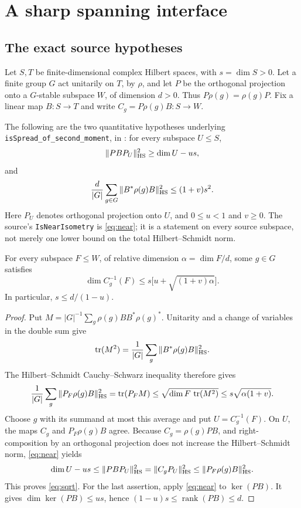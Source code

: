 \section{A sharp spanning interface}
\label{sec:sharp-spanning}
\subsection{The exact source hypotheses}

Let \(S,T\) be finite-dimensional complex Hilbert spaces, with
\(s=\dim S>0\). Let a finite group \(G\) act unitarily on \(T\), by
\(\rho\), and let \(P\) be the orthogonal projection onto a
\(G\)-stable subspace \(W\), of dimension \(d>0\). Thus
\(P\rho(g)=\rho(g)P\). Fix a linear map \(B:S\to T\) and write
\(C_g=P\rho(g)B:S\to W\).

The following are the two quantitative hypotheses underlying
\texttt{isSpread\_of\_second\_moment}, in
:
for every subspace \(U\le S\),
\begin{equation}\label{eq:near}
 \|PB P_U\|_{\mathrm{HS}}^2\ge \dim U-u s,
\end{equation}
and
\begin{equation}\label{eq:moment}
 \frac d{|G|}\sum_{g\in G}\|B^*\rho(g)B\|_{\mathrm{HS}}^2
 \le (1+v)s^2.
\end{equation}
Here \(P_U\) denotes orthogonal projection onto \(U\), and
\(0\le u<1\) and \(v\ge0\). The source's \texttt{IsNearIsometry} is
\eqref{eq:near}; it is a statement on every source subspace, not merely
one lower bound on the total Hilbert--Schmidt norm.

\begin{lemma}\label{lem:sqrt}
For every subspace \(F\le W\), of relative dimension
\(\alpha=\dim F/d\), some \(g\in G\) satisfies
\begin{equation}\label{eq:sqrt}
 \dim C_g^{-1}(F)
 \le s\bigl[u+\sqrt{(1+v)\alpha}\bigr].
\end{equation}
In particular, \(s\le d/(1-u)\).
\end{lemma}

\begin{proof}
Put
\(M=|G|^{-1}\sum_g\rho(g)BB^*\rho(g)^*\).
Unitarity and a change of variables in the double sum give
\[
 \operatorname{tr}(M^2)=\frac1{|G|}\sum_g\|B^*\rho(g)B\|_{\mathrm{HS}}^2.
\]
The Hilbert--Schmidt Cauchy--Schwarz inequality therefore gives
\[
 \frac1{|G|}\sum_g\|P_F\rho(g)B\|_{\mathrm{HS}}^2
 =\operatorname{tr}(P_FM)
 \le\sqrt{\dim F\,\operatorname{tr}(M^2)}
 \le s\sqrt{\alpha(1+v)}.
\]
Choose \(g\) with its summand at most this average and put
\(U=C_g^{-1}(F)\). On \(U\), the maps \(C_g\) and
\(P_F\rho(g)B\) agree. Because \(C_g=\rho(g)PB\), and
right-composition by an orthogonal projection does not increase the
Hilbert--Schmidt norm, \eqref{eq:near} yields
\[
 \dim U-u s
 \le\|PB P_U\|_{\mathrm{HS}}^2
 =\|C_gP_U\|_{\mathrm{HS}}^2
 \le\|P_F\rho(g)B\|_{\mathrm{HS}}^2.
\]
This proves \eqref{eq:sqrt}. For the last assertion, apply
\eqref{eq:near} to \(\ker(PB)\). It gives
\(\dim\ker(PB)\le u s\), hence
\((1-u)s\le\operatorname{rank}(PB)\le d\).
\end{proof}

